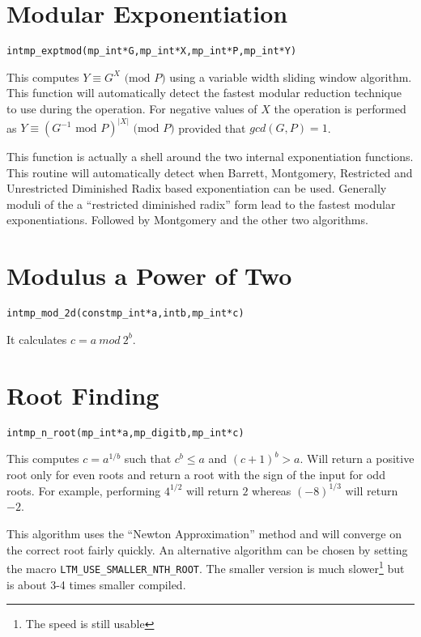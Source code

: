 \documentclass[synpaper]{book}
\def\mod{{\mathit\ mod\ }}
\begin{document}
\section{Modular Exponentiation}
\begin{alltt}
int mp_exptmod (mp_int * G, mp_int * X, mp_int * P, mp_int * Y)
\end{alltt}
This computes $Y \equiv G^X \mbox{ (mod }P\mbox{)}$ using a variable width sliding window algorithm.  This function
will automatically detect the fastest modular reduction technique to use during the operation.  For negative values of
$X$ the operation is performed as $Y \equiv (G^{-1} \mbox{ mod }P)^{\vert X \vert} \mbox{ (mod }P\mbox{)}$ provided that
$gcd(G, P) = 1$.

This function is actually a shell around the two internal exponentiation functions.  This routine will automatically
detect when Barrett, Montgomery, Restricted and Unrestricted Diminished Radix based exponentiation can be used.  Generally
moduli of the a ``restricted diminished radix'' form lead to the fastest modular exponentiations.  Followed by Montgomery
and the other two algorithms.

\section{Modulus a Power of Two}
\begin{alltt}
int mp_mod_2d(const mp_int *a, int b, mp_int *c)
\end{alltt}
It calculates $c = a \mod 2^b$.

\section{Root Finding}
\begin{alltt}
int mp_n_root (mp_int * a, mp_digit b, mp_int * c)
\end{alltt}
This computes $c = a^{1/b}$ such that $c^b \le a$ and $(c+1)^b > a$. Will return a positive root only for even roots and return a root with the sign of the input for odd roots.  For example, performing $4^{1/2}$ will return $2$ whereas $(-8)^{1/3}$ will return $-2$.

This algorithm uses the ``Newton Approximation'' method and will converge on the correct root fairly quickly.
An alternative algorithm can be chosen by setting the macro \texttt{LTM\_USE\_SMALLER\_NTH\_ROOT}. The smaller version is much slower\footnote{The speed is still usable} but is about 3-4 times smaller compiled.
\end{document}
